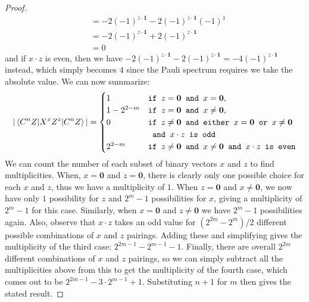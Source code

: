 \documentclass[12pt]{dalthesis}
\begin{document}
\begin{proof}
\begin{equation*}
\begin{split}
& = -2(-1)^{z \cdot \textbf{1}} - 2(-1)^{z \cdot \textbf{1}} (-1)^1 \\
& = -2(-1)^{z \cdot \textbf{1}} + 2(-1)^{z \cdot \textbf{1}} \\
& = 0
\end{split}
\end{equation*}
and if $x \cdot z$ is even, then we have $-2(-1)^{z \cdot \textbf{1}} - 2(-1)^{z \cdot \textbf{1}} = -4(-1)^{z \cdot \textbf{1}}$ instead, which simply becomes $4$ since the Pauli spectrum requires we take the absolute value. We can now summarize:
\begin{equation*}
|\braket{C^n Z|X^xZ^z|C^n Z}| = \begin{cases}
1 & \texttt{if } z = \textbf{0} \texttt{ and } x = \textbf{0}, \\
1 - 2^{2-m} & \texttt{if } z = \textbf{0} \texttt{ and } x \neq \textbf{0}, \\
0 & \texttt{if } z \neq \textbf{0} \texttt{ and either } x = \textbf{0} \texttt{ or } x \neq \textbf{0} \\
& \texttt{ and }x \cdot z \texttt{ is odd} \\
2^{2-m} & \texttt{if } z \neq \textbf{0} \texttt{ and } x \neq \textbf{0}
 \texttt{ and } x \cdot z \texttt{ is even}
\end{cases}
\end{equation*}
We can count the number of each subset of binary vectors $x$ and $z$ to find multiplicities. When, $x=\textbf{0}$ and $z = \textbf{0}$, there is clearly only one possible choice for each $x$ and $z$, thus we have a multiplicity of $1$. When $z = \textbf{0}$ and $x \neq \textbf{0}$, we now have only $1$ possibility for $z$ and $2^{m} - 1$ possibilities for $x$, giving a multiplicity of $2^{m} - 1$ for this case. Similarly, when $x = \textbf{0}$ and $z \neq \textbf{0}$ we have $2^{m} - 1$ possibilities again. Also, observe that $x \cdot z$ takes an odd value for $(2^{2m}-2^{m})/2$ different possible combinations of $x$ and $z$ pairings. Adding these and simplifying gives the multiplicity of the third case: $2^{2m-1} - 2^{m-1} - 1$. Finally, there are overall $2^{2m}$ different combinations of $x$ and $z$ pairings, so we can simply subtract all the multiplicities above from this to get the multiplicity of the fourth case, which comes out to be $2^{2m-1} - 3 \cdot 2^{m-1} + 1$. Substituting $n+1$ for $m$ then gives the stated result.
\end{proof}
\end{document}

